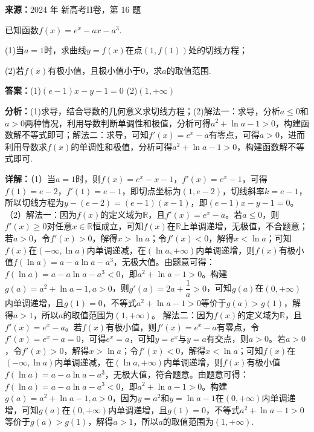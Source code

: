 \begin{question}[points=15]
\textbf{来源：}2024 年 新高考II卷，第 16 题\par
已知函数$f(x)=e^x-ax-a^3$.

(1)当$a=1$时，求曲线$y=f(x)$在点$(1,f(1))$处的切线方程；

(2)若$f(x)$有极小值，且极小值小于0，求$a$的取值范围.
\begin{solution}
\textbf{答案：}(1)$(e-1)x-y-1=0$
(2)$(1,+\infty)$

\textbf{分析：}(1)求导，结合导数的几何意义求切线方程；(2)解法一：求导，分析$a\le0$和$a>0$两种情况，利用导数判断单调性和极值，分析可得$a^2+\ln a-1>0$，构建函数解不等式即可；解法二：求导，可知$f'(x)=e^x-a$有零点，可得$a>0$，进而利用导数求$f(x)$的单调性和极值，分析可得$a^2+\ln a-1>0$，构建函数解不等式即可.

\textbf{详解：}（1）当$a=1$时，则$f(x)=e^x-x-1$，$f'(x)=e^x-1$，可得$f(1)=e-2$，$f'(1)=e-1$，即切点坐标为$(1,e-2)$，切线斜率$k=e-1$，所以切线方程为$y-(e-2)=(e-1)(x-1)$，即$(e-1)x-y-1=0$。
（2）解法一：因为$f(x)$的定义域为$\mathbb{R}$，且$f'(x)=e^x-a$。若$a\le0$，则$f'(x)\ge0$对任意$x\in\mathbb{R}$恒成立，可知$f(x)$在$\mathbb{R}$上单调递增，无极值，不合题意；若$a>0$，令$f'(x)>0$，解得$x>\ln a$；令$f'(x)<0$，解得$x<\ln a$；可知$f(x)$在$(-\infty,\ln a)$内单调递减，在$(\ln a,+\infty)$内单调递增，则$f(x)$有极小值$f(\ln a)=a-a\ln a-a^3$，无极大值。由题意可得：$f(\ln a)=a-a\ln a-a^3<0$，即$a^2+\ln a-1>0$。构建$g(a)=a^2+\ln a-1,a>0$，则$g'(a)=2a+\dfrac{1}{a}>0$，可知$g(a)$在$(0,+\infty)$内单调递增，且$g(1)=0$，不等式$a^2+\ln a-1>0$等价于$g(a)>g(1)$，解得$a>1$，所以$a$的取值范围为$(1,+\infty)$。
解法二：因为$f(x)$的定义域为$\mathbb{R}$，且$f'(x)=e^x-a$。若$f(x)$有极小值，则$f'(x)=e^x-a$有零点，令$f'(x)=e^x-a=0$，可得$e^x=a$，可知$y=e^x$与$y=a$有交点，则$a>0$。若$a>0$，令$f'(x)>0$，解得$x>\ln a$；令$f'(x)<0$，解得$x<\ln a$；可知$f(x)$在$(-\infty,\ln a)$内单调递减，在$(\ln a,+\infty)$内单调递增，则$f(x)$有极小值$f(\ln a)=a-a\ln a-a^3$，无极大值，符合题意。由题意可得：$f(\ln a)=a-a\ln a-a^3<0$，即$a^2+\ln a-1>0$。构建$g(a)=a^2+\ln a-1,a>0$，因为$y=a^2$和$y=\ln a-1$在$(0,+\infty)$内单调递增，可知$g(a)$在$(0,+\infty)$内单调递增，且$g(1)=0$，不等式$a^2+\ln a-1>0$等价于$g(a)>g(1)$，解得$a>1$，所以$a$的取值范围为$(1,+\infty)$.
\end{solution}
\end{question}

